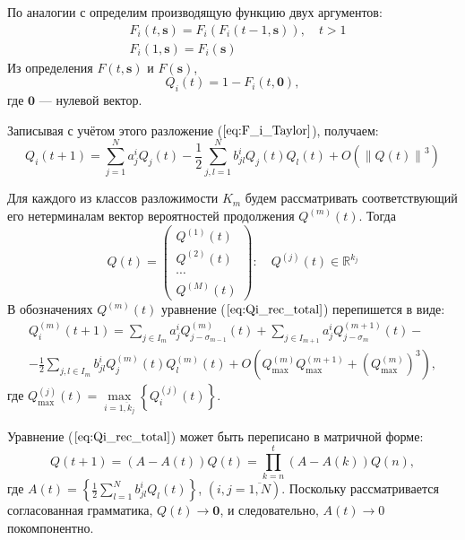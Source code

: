 \documentclass[12pt]{article}
\begin{document}
По аналогии с \cite{lit:sev_vp} определим производящую функцию двух аргументов:
\begin{equation}
\begin{split}
	&F_i(t,\mathbf{s}) = F_i(F_i(t-1,\mathbf{s})),\quad t > 1 \\
	&F_i(1,\mathbf{s}) = F_i(\mathbf{s})
\end{split}
\end{equation}
Из определения $F(t,\mathbf{s})$ и $F(\mathbf{s})$,
\begin{equation*}
	Q_i(t) = 1 - F_i(t,\mathbf{0}),
\end{equation*}
где $\mathbf{0}$ --- нулевой вектор.

Записывая с учётом этого разложение ($\ref{eq:F_i_Taylor}$), получаем:
\begin{equation}
\label{eq:Qi_rec_total}
	Q_i(t+1) = \sum_{j=1}^N a^i_j Q_j(t) - \frac{1}{2} \sum_{j,l=1}^N b^i_{jl} Q_j(t)Q_l(t) + O(\left\| Q(t) \right\|^3)
\end{equation}

Для каждого из классов разложимости $K_m$ будем рассматривать со\-от\-вет\-ству\-ю\-щий его нетерминалам вектор вероятностей продолжения $Q^{(m)}(t)$. Тогда
\begin{equation*}
	Q(t) =
	\begin{pmatrix}
		Q^{(1)}(t) \\
		Q^{(2)}(t) \\
		\cdots \\
		Q^{(M)}(t)
	\end{pmatrix}:\quad
	Q^{(j)}(t) \in \mathbb{R}^{k_j}	
\end{equation*}
В обозначениях $Q^{(m)}(t)$ уравнение ($\ref{eq:Qi_rec_total}$) перепишется в виде:
\begin{multline}
\label{eq:Qi rec}
	Q^{(m)}_i(t+1) = \sum_{j \in I_m} a^i_j Q^{(m)}_{j-\sigma_{m-1}}(t) + \sum_{j \in I_{m+1}} a^i_j Q^{(m+1)}_{j-\sigma_{m}}(t) - \\
	- \frac{1}{2} \sum_{j,l \in I_m} b^i_{jl} Q^{(m)}_j(t)Q^{(m)}_l(t) + O\left(Q^{(m)}_{\mathrm{max}}Q^{(m+1)}_{\mathrm{max}} + \left(Q^{(m)}_{\mathrm{max}}\right)^3\right),
\end{multline}
где $Q^{(j)}_{\mathrm{max}}(t) = \max\limits_{i=\overline{1,k_j}} \left\{Q^{(j)}_i(t)\right\}$.

Уравнение ($\ref{eq:Qi_rec_total}$) может быть переписано в матричной форме:
\begin{equation}
	Q(t+1) = (A-A(t)) Q(t) = \prod_{k=n}^t (A - A(k))Q(n),
\end{equation}
где $A(t) = \left\{ \frac{1}{2} \sum\limits_{l = 1}^N b^i_{jl} Q_l(t) \right\}$, $(i,j = \overline{1,N})$. Поскольку рассматривается согласованная грамматика, $Q(t) \rightarrow \mathbf{0}$, и следовательно, $A(t) \rightarrow 0$ покомпонентно.
\end{document}
